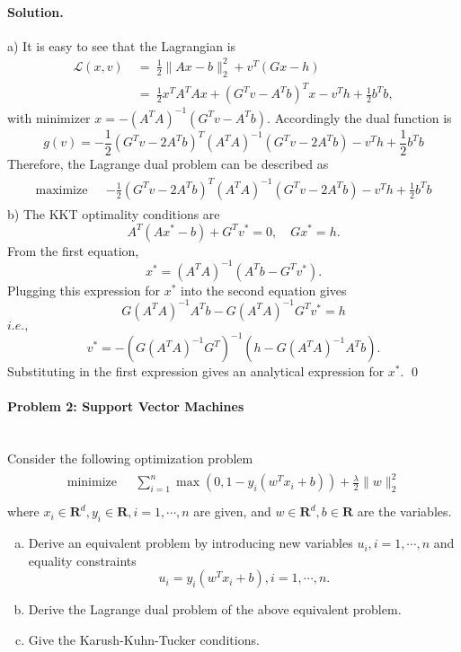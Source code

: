 \documentclass[a4paper]{article}
\newenvironment{solution}
{\color{blue} \paragraph{Solution.\\}}
{\newline \qed}
\begin{document}
\begin{solution}
a) It is easy to see that the Lagrangian is
\begin{equation}\nonumber
\begin{aligned}
	\mathcal{L}(x,v) \ &=\  \frac{1}{2}\|Ax-b\|_2^2+v^T(Gx-h)\\ \ &=\ \frac{1}{2} x^TA^TAx + (G^Tv - A^Tb)^Tx - v^Th + \frac{1}{2} b^Tb,
\end{aligned}
\end{equation}
with minimizer $x=-(A^TA)^{-1}(G^Tv-A^Tb)$. Accordingly the dual function is $$g(v)=-\frac{1}{2}(G^Tv-2A^Tb)^T(A^TA)^{-1}(G^Tv-2A^Tb)-v^Th+\frac{1}{2}b^Tb$$ 
Therefore, the Lagrange dual problem can be described as
\begin{gather*}
\begin{matrix}
\text{maximize~~} & -\frac{1}{2}(G^Tv-2A^Tb)^T(A^TA)^{-1}(G^Tv-2A^Tb)-v^Th+\frac{1}{2}b^Tb
\end{matrix}
\end{gather*}
\quad b) The KKT optimality conditions are $$A^T(Ax^*-b)+G^Tv^*=0,\quad Gx^*=h.$$
From the first equation, $$x^*=(A^TA)^{-1}(A^Tb-G^Tv^*).$$ Plugging this expression for $x^*$ into the second equation gives $$G(A^TA)^{-1}A^Tb-G(A^TA)^{-1}G^Tv^*=h$$ $i.e.,$ $$v^*=-(G(A^TA)^{-1}G^T)^{-1}(h-G(A^TA)^{-1}A^Tb).$$ Substituting in the first expression gives an analytical expression for $x^*$.
\end{solution}

\paragraph{Problem 2: Support Vector Machines}
~\\
Consider the following optimization problem
\begin{gather*}
\begin{matrix}
\text{minimize~~} & \sum_{i=1}^n\max\left(0,1-y_i(w^Tx_i+b)\right)+\frac{\lambda}{2}\|w\|_2^2\\
\end{matrix}
\end{gather*}
where $x_i\in\mathbf{R}^{d},y_i\in \mathbf{R},i=1,\cdots,n$ are given, and $w\in \mathbf{R}^d,b\in\mathbf{R}$ are the variables.
\begin{enumerate}[a)]
    \item Derive an equivalent problem by introducing new variables $u_i,i=1,\cdots,n$ and equality constraints \[u_i=y_i(w^Tx_i+b),i=1,\cdots,n.\]
    \item Derive the Lagrange dual problem of the above equivalent problem.
    \item Give the Karush-Kuhn-Tucker conditions.
\end{enumerate}
\end{document}

